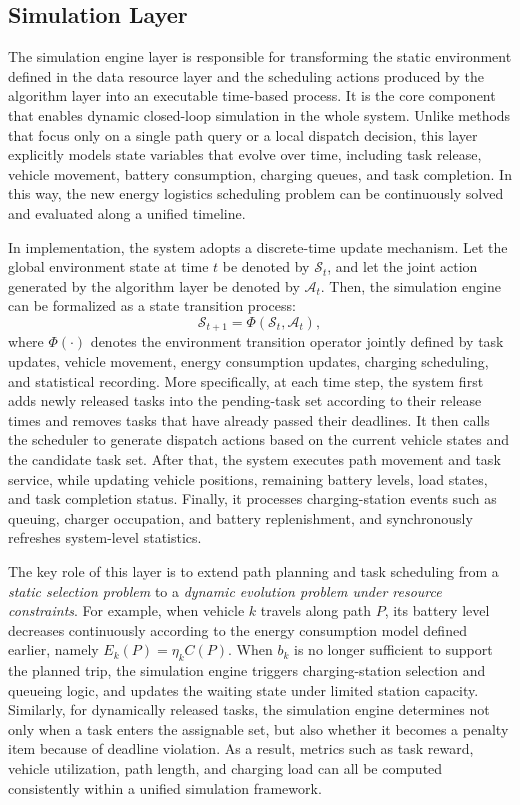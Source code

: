 \subsection{Simulation Layer}
The simulation engine layer is responsible for transforming the static environment defined in the data resource layer and the scheduling actions produced by the algorithm layer into an executable time-based process. It is the core component that enables dynamic closed-loop simulation in the whole system. Unlike methods that focus only on a single path query or a local dispatch decision, this layer explicitly models state variables that evolve over time, including task release, vehicle movement, battery consumption, charging queues, and task completion. In this way, the new energy logistics scheduling problem can be continuously solved and evaluated along a unified timeline.

In implementation, the system adopts a discrete-time update mechanism. Let the global environment state at time \(t\) be denoted by \(\mathcal{S}_t\), and let the joint action generated by the algorithm layer be denoted by \(\mathcal{A}_t\). Then, the simulation engine can be formalized as a state transition process:
\[
\mathcal{S}_{t+1} = \Phi(\mathcal{S}_t, \mathcal{A}_t),
\]
where \(\Phi(\cdot)\) denotes the environment transition operator jointly defined by task updates, vehicle movement, energy consumption updates, charging scheduling, and statistical recording. More specifically, at each time step, the system first adds newly released tasks into the pending-task set according to their release times and removes tasks that have already passed their deadlines. It then calls the scheduler to generate dispatch actions based on the current vehicle states and the candidate task set. After that, the system executes path movement and task service, while updating vehicle positions, remaining battery levels, load states, and task completion status. Finally, it processes charging-station events such as queuing, charger occupation, and battery replenishment, and synchronously refreshes system-level statistics.

The key role of this layer is to extend path planning and task scheduling from a \emph{static selection problem} to a \emph{dynamic evolution problem under resource constraints}. For example, when vehicle \(k\) travels along path \(P\), its battery level decreases continuously according to the energy consumption model defined earlier, namely \(E_k(P)=\eta_k C(P)\). When \(b_k\) is no longer sufficient to support the planned trip, the simulation engine triggers charging-station selection and queueing logic, and updates the waiting state under limited station capacity. Similarly, for dynamically released tasks, the simulation engine determines not only when a task enters the assignable set, but also whether it becomes a penalty item because of deadline violation. As a result, metrics such as task reward, vehicle utilization, path length, and charging load can all be computed consistently within a unified simulation framework.



